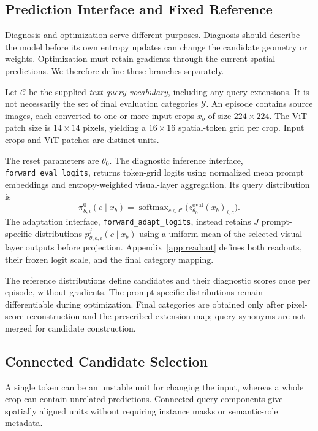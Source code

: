 \documentclass[letterpaper]{article}
\begin{document}
\subsection{Prediction Interface and Fixed Reference}
Diagnosis and optimization serve different purposes. Diagnosis should describe the model before its own entropy updates can change the candidate geometry or weights. Optimization must retain gradients through the current spatial predictions. We therefore define these branches separately.

Let $\mathcal C$ be the supplied \emph{text-query vocabulary}, including any query extensions. It is not necessarily the set of final evaluation categories $\mathcal Y$. An episode contains source images, each converted to one or more input crops $x_b$ of size $224\times224$. The ViT patch size is $14\times14$ pixels, yielding a $16\times16$ spatial-token grid per crop. Input crops and ViT patches are distinct units.

The reset parameters are $\theta_0$. The diagnostic inference interface, \texttt{forward\_eval\_logits}, returns token-grid logits using normalized mean prompt embeddings and entropy-weighted visual-layer aggregation. Its query distribution is
\begin{equation}
\pi^0_{b,i}(c\mid x_b)=\operatorname{softmax}_{c\in\mathcal C}
\bigl(z^{\mathrm{eval}}_{\theta_0}(x_b)_{i,c}\bigr).
\label{eq:reference}
\end{equation}
The adaptation interface, \texttt{forward\_adapt\_logits}, instead retains $J$ prompt-specific distributions $p^j_{\theta,b,i}(c\mid x_b)$ using a uniform mean of the selected visual-layer outputs before projection. Appendix~\ref{app:readout} defines both readouts, their frozen logit scale, and the final category mapping.

The reference distributions define candidates and their diagnostic scores once per episode, without gradients. The prompt-specific distributions remain differentiable during optimization. Final categories are obtained only after pixel-score reconstruction and the prescribed extension map; query synonyms are not merged for candidate construction.

\subsection{Connected Candidate Selection}
A single token can be an unstable unit for changing the input, whereas a whole crop can contain unrelated predictions. Connected query components give spatially aligned units without requiring instance masks or semantic-role metadata.
\end{document}
